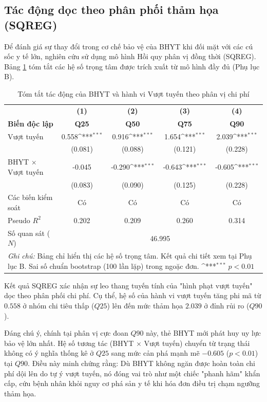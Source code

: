 \documentclass[12pt,a4paper]{article}
\begin{document}
\subsection{Tác động dọc theo phân phối thảm họa (SQREG)}

Để đánh giá sự thay đổi trong cơ chế bảo vệ của BHYT khi đối mặt với các cú sốc y tế lớn, nghiên cứu sử dụng mô hình Hồi quy phân vị đồng thời (SQREG). Bảng \ref{tab:sqreg_summary} tóm tắt các hệ số trọng tâm được trích xuất từ mô hình đầy đủ (Phụ lục B).

\begin{table}[htbp]
	\centering
	\def\sym#1{\ifmmode^{#1}\else\(^{#1}\)\fi}
	\caption{Tóm tắt tác động của BHYT và hành vi Vượt tuyến theo phân vị chi phí}
	\label{tab:sqreg_summary}
	\begin{tabular}{lcccc}
		\toprule
		&\textbf{(1)}&\textbf{(2)}&\textbf{(3)}&\textbf{(4)}\\
		\textbf{Biến độc lập}&\textbf{Q25}&\textbf{Q50}&\textbf{Q75}&\textbf{Q90}\\
		\midrule
		Vượt tuyến & 0.558\sym{***} & 0.916\sym{***} & 1.654\sym{***} & 2.039\sym{***} \\
		& (0.081) & (0.088) & (0.121) & (0.228) \\
		\addlinespace
		BHYT $\times$ Vượt tuyến & -0.045 & -0.290\sym{***} & -0.643\sym{***} & -0.605\sym{***} \\
		& (0.083) & (0.090) & (0.125) & (0.228) \\
		\midrule
		Các biến kiểm soát & Có & Có & Có & Có \\
		\midrule
		Pseudo $R^2$ & 0.202 & 0.209 & 0.260 & 0.314 \\
		Số quan sát ($N$) & \multicolumn{4}{c}{46.995} \\
		\bottomrule
		\multicolumn{5}{p{13cm}}{\footnotesize \textit{Ghi chú:} Bảng chỉ hiển thị các hệ số trọng tâm. Kết quả chi tiết xem tại Phụ lục B. Sai số chuẩn bootstrap (100 lần lặp) trong ngoặc đơn. \sym{***} \(p<0.01\)}
	\end{tabular}
\end{table}


Kết quả SQREG xác nhận sự leo thang tuyến tính của "hình phạt vượt tuyến" dọc theo phân phối chi phí. Cụ thể, hệ số của hành vi vượt tuyến tăng phi mã từ $0.558$ ở nhóm chi tiêu thấp ($Q25$) lên đến mức thảm họa $2.039$ ở đỉnh rủi ro ($Q90$). 

Đáng chú ý, chính tại phân vị cực đoan $Q90$ này, thẻ BHYT mới phát huy uy lực bảo vệ lớn nhất. Hệ số tương tác (BHYT $\times$ Vượt tuyến) chuyển từ trạng thái không có ý nghĩa thống kê ở $Q25$ sang mức cản phá mạnh mẽ $-0.605$ ($p < 0.01$) tại $Q90$. Điều này minh chứng rằng: Dù BHYT không ngăn được hoàn toàn chi phí dội lên do tự ý vượt tuyến, nó đóng vai trò như một chiếc "phanh hãm" khẩn cấp, cứu bệnh nhân khỏi nguy cơ phá sản y tế khi hóa đơn điều trị chạm ngưỡng thảm họa.
\end{document}
